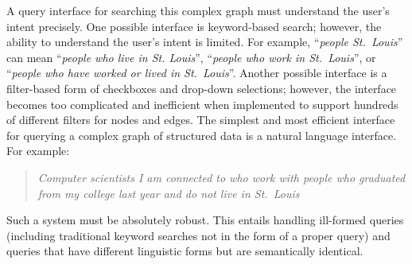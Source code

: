 \documentclass{article}
\begin{document}
A query interface for searching this complex graph must understand the user's intent precisely. One possible interface is keyword-based search; however, the ability to understand the user's intent is limited. For example, ``\textit{people St.\ Louis}'' can mean ``\textit{people who live in St. Louis}'', ``\textit{people who work in St.\ Louis}'', or ``\textit{people who have worked or lived in St.\ Louis}''. Another possible interface is a filter-based form of checkboxes and drop-down selections; however, the interface becomes too complicated and inefficient when implemented to support hundreds of different filters for nodes and edges. The simplest and most efficient interface for querying a complex graph of structured data is a natural language interface. For example:
\begin{quote}
\textit{Computer scientists I am connected to who work with people who graduated from my college last year and do not live in St.\ Louis}
\end{quote}
Such a system must be absolutely robust. This entails handling ill-formed queries (including traditional keyword searches not in the form of a proper query) and queries that have different linguistic forms but are semantically identical.
\end{document}
